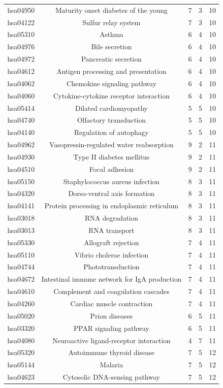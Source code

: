 \begin{center}
\begin{longtable}{@{}ccccc@{}}
hsa04950	&Maturity onset diabetes of the young&	7&	3&	10\\
hsa04122	&Sulfur relay system&	7&	3&	10\\
hsa05310	&Asthma&	6&	4&	10\\
hsa04976	&Bile secretion&	6&	4&	10\\
hsa04972	&Pancreatic secretion&	6&	4&	10\\
hsa04612	&Antigen processing and presentation&	6&	4&	10\\
hsa04062	&Chemokine signaling pathway&	6&	4&	10\\
hsa04060	&Cytokine-cytokine receptor interaction&	6&	4&	10\\
hsa05414	&Dilated cardiomyopathy&	5&	5&	10\\
hsa04740	&Olfactory transduction&	5&	5&	10\\
hsa04140	&Regulation of autophagy&	5&	5&	10\\
hsa04962	&Vasopressin-regulated water reabsorption&	9&	2&	11\\
hsa04930	&Type II diabetes mellitus&	9&	2&	11\\
hsa04510	&Focal adhesion&	9&	2&	11\\
hsa05150	&Staphylococcus aureus infection&	8&	3&	11\\
hsa04320	&Dorso-ventral axis formation&	8&	3&	11\\
hsa04141	&Protein processing in endoplasmic reticulum&	8&	3&	11\\
hsa03018	&RNA degradation&	8&	3&	11\\
hsa03013	&RNA transport&	8&	3&	11\\
hsa05330	&Allograft rejection&	7&	4&	11\\
hsa05110	&Vibrio cholerae infection&	7&	4&	11\\
hsa04744	&Phototransduction&	7&	4&	11\\
hsa04672	&Intestinal immune network for IgA production&	7&	4&	11\\
hsa04610	&Complement and coagulation cascades&	7&	4&	11\\
hsa04260	&Cardiac muscle contraction&	7&	4&	11\\
hsa05020	&Prion diseases&	6&	5&	11\\
hsa03320	&PPAR signaling pathway&	6&	5&	11\\
hsa04080	&Neuroactive ligand-receptor interaction&	4&	7&	11\\
hsa05320	&Autoimmune thyroid disease&	7&	5&	12\\
hsa05144	&Malaria&	7&	5&	12\\
hsa04623	&Cytosolic DNA-sensing pathway&	7&	5&	12\\
\hline
 \end{longtable}
\end{center}


